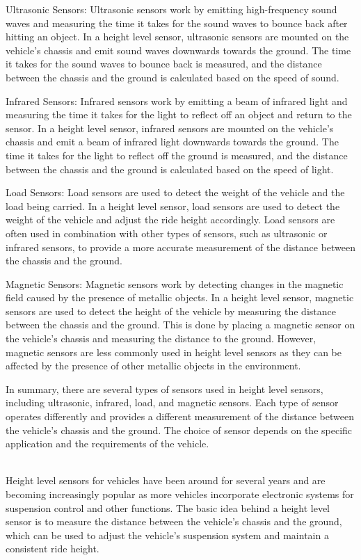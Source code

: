 \documentclass[11pt]{article}
\begin{document}
Ultrasonic Sensors: Ultrasonic sensors work by emitting high-frequency sound waves and measuring the time it takes for the sound waves to bounce back after hitting an object. In a height level sensor, ultrasonic sensors are mounted on the vehicle's chassis and emit sound waves downwards towards the ground. The time it takes for the sound waves to bounce back is measured, and the distance between the chassis and the ground is calculated based on the speed of sound.

Infrared Sensors: Infrared sensors work by emitting a beam of infrared light and measuring the time it takes for the light to reflect off an object and return to the sensor. In a height level sensor, infrared sensors are mounted on the vehicle's chassis and emit a beam of infrared light downwards towards the ground. The time it takes for the light to reflect off the ground is measured, and the distance between the chassis and the ground is calculated based on the speed of light.

Load Sensors: Load sensors are used to detect the weight of the vehicle and the load being carried. In a height level sensor, load sensors are used to detect the weight of the vehicle and adjust the ride height accordingly. Load sensors are often used in combination with other types of sensors, such as ultrasonic or infrared sensors, to provide a more accurate measurement of the distance between the chassis and the ground.

Magnetic Sensors: Magnetic sensors work by detecting changes in the magnetic field caused by the presence of metallic objects. In a height level sensor, magnetic sensors are used to detect the height of the vehicle by measuring the distance between the chassis and the ground. This is done by placing a magnetic sensor on the vehicle's chassis and measuring the distance to the ground. However, magnetic sensors are less commonly used in height level sensors as they can be affected by the presence of other metallic objects in the environment.

In summary, there are several types of sensors used in height level sensors, including ultrasonic, infrared, load, and magnetic sensors. Each type of sensor operates differently and provides a different measurement of the distance between the vehicle's chassis and the ground. The choice of sensor depends on the specific application and the requirements of the vehicle.

\indent \\Height level sensors for vehicles have been around for several years and are becoming increasingly popular as more vehicles incorporate electronic systems for suspension control and other functions. The basic idea behind a height level sensor is to measure the distance between the vehicle's chassis and the ground, which can be used to adjust the vehicle's suspension system and maintain a consistent ride height.
\end{document}

